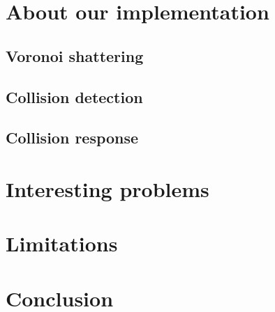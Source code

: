 \documentclass[10pt]{article}
\begin{document}
\FloatBarrier


\newpage
\section{About our implementation}
\subsection{Voronoi shattering}

\subsection{Collision detection}

\subsection{Collision response}

\section{Interesting problems}

\section{Limitations}

\section{Conclusion}
\end{document}
